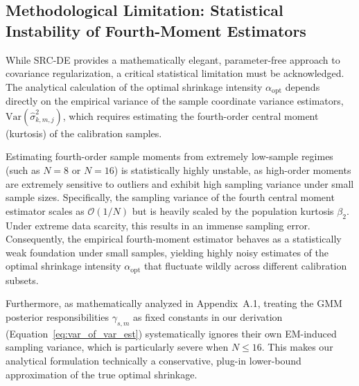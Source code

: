 \subsection{Methodological Limitation: Statistical Instability of Fourth-Moment Estimators}
While SRC-DE provides a mathematically elegant, parameter-free approach to covariance regularization, a critical statistical limitation must be acknowledged. The analytical calculation of the optimal shrinkage intensity $\alpha_{\text{opt}}$ depends directly on the empirical variance of the sample coordinate variance estimators, $\text{Var}(\hat{\sigma}^2_{k, m, j})$, which requires estimating the fourth-order central moment (kurtosis) of the calibration samples.

Estimating fourth-order sample moments from extremely low-sample regimes (such as $N=8$ or $N=16$) is statistically highly unstable, as high-order moments are extremely sensitive to outliers and exhibit high sampling variance under small sample sizes. Specifically, the sampling variance of the fourth central moment estimator scales as $\mathcal{O}(1/N)$ but is heavily scaled by the population kurtosis $\beta_2$. Under extreme data scarcity, this results in an immense sampling error. Consequently, the empirical fourth-moment estimator behaves as a statistically weak foundation under small samples, yielding highly noisy estimates of the optimal shrinkage intensity $\alpha_{\text{opt}}$ that fluctuate wildly across different calibration subsets. 

Furthermore, as mathematically analyzed in Appendix~A.1, treating the GMM posterior responsibilities $\gamma_{s, m}$ as fixed constants in our derivation (Equation~\ref{eq:var_of_var_est}) systematically ignores their own EM-induced sampling variance, which is particularly severe when $N \le 16$. This makes our analytical formulation technically a conservative, plug-in lower-bound approximation of the true optimal shrinkage.

